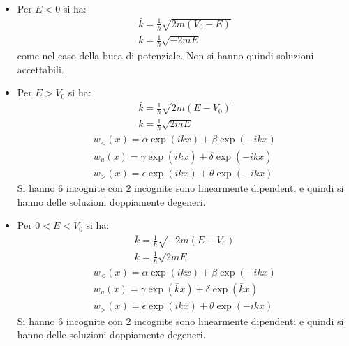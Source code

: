 \begin{itemize}
\item Per $E<0$ si ha:
\begin{equation}\begin{split}
\bar k=\frac{1}{\hbar }\sqrt{2m\left(V_0-E\right)}\\
k=\frac{1}{\hbar }\sqrt{-2mE}
\end{split}\end{equation}
come nel caso della buca di potenziale. Non si hanno quindi soluzioni accettabili.

\item Per $E>V_0$ si ha:
\begin{equation}\begin{split}
\bar k=\frac{1}{\hbar }\sqrt{2m\left(E-V_0\right)}\\
k=\frac{1}{\hbar }\sqrt{2mE}
\end{split}\end{equation}
\begin{equation}\begin{split}
w_<\left(x\right)=\alpha\exp{\left(ikx\right)}+\beta\exp{\left(-ikx\right)} \\
w_u\left(x\right)=\gamma\exp{\left(i\bar kx\right)}+\delta\exp{\left(-i\bar kx\right)} \\
w_>\left(x\right)=\epsilon\exp{\left(ikx\right)}+\theta\exp{\left(-ikx\right)}
\end{split}\end{equation}
Si hanno $6$ incognite con $2$ incognite sono linearmente dipendenti e quindi si hanno delle soluzioni doppiamente degeneri.

\item Per $0<E<V_0$ si ha:
\begin{equation}\begin{split}
\bar k=\frac{1}{\hbar }\sqrt{-2m\left(E-V_0\right)}\\
k=\frac{1}{\hbar }\sqrt{2mE}
\end{split}\end{equation}
\begin{equation}\begin{split}
w_<\left(x\right)=\alpha\exp{\left(ikx\right)}+\beta\exp{\left(-ikx\right)} \\
w_u\left(x\right)=\gamma\exp{\left(\bar kx\right)}+\delta\exp{\left(\bar kx\right)} \\
w_>\left(x\right)=\epsilon\exp{\left(ikx\right)}+\theta\exp{\left(-ikx\right)}
\end{split}\end{equation}
Si hanno $6$ incognite con $2$ incognite sono linearmente dipendenti e quindi si hanno delle soluzioni doppiamente degeneri.
\end{itemize}

